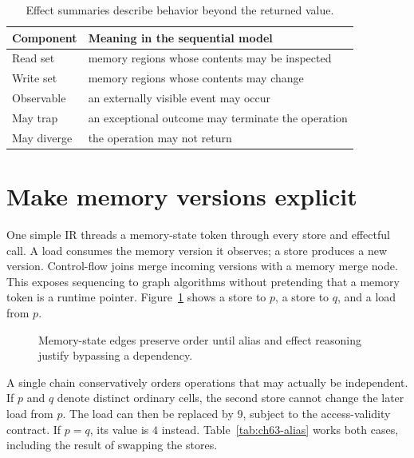 \begin{table}[htbp]
\caption{Effect summaries describe behavior beyond the returned value.}
\label{tab:ch63-effects}
\centering
\begin{tabular}{ll}
\toprule
Component & Meaning in the sequential model \\
\midrule
Read set & memory regions whose contents may be inspected \\
Write set & memory regions whose contents may change \\
Observable & an externally visible event may occur \\
May trap & an exceptional outcome may terminate the operation \\
May diverge & the operation may not return \\
\bottomrule
\end{tabular}
\end{table}

\section{Make memory versions explicit}
\label{sec:ch63-memory}

One simple IR threads a memory-state token through every store and effectful call.
A load consumes the memory version it observes; a store produces a new version.
Control-flow joins merge incoming versions with a memory merge node.
This exposes sequencing to graph algorithms without pretending that a memory token is a runtime pointer.
Figure~\ref{fig:ch63-token} shows a store to $p$, a store to $q$, and a load from $p$.

\begin{figure}[htbp]
\centering
{}
\caption{Memory-state edges preserve order until alias and effect reasoning justify bypassing a dependency.}
\label{fig:ch63-token}
\end{figure}

A single chain conservatively orders operations that may actually be independent.
If $p$ and $q$ denote distinct ordinary cells, the second store cannot change the later load from $p$.
The load can then be replaced by $9$, subject to the access-validity contract.
If $p=q$, its value is $4$ instead.
Table~\ref{tab:ch63-alias} works both cases, including the result of swapping the stores.

